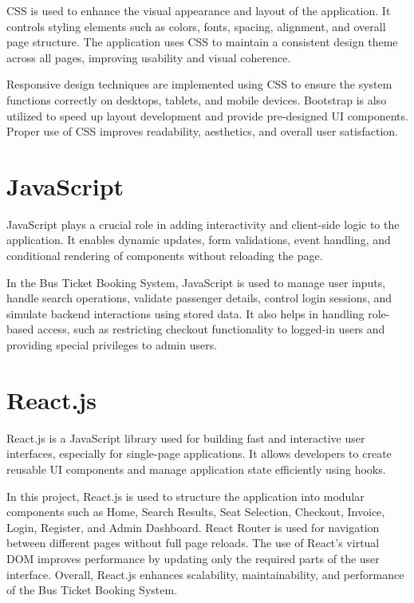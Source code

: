 CSS is used to enhance the visual appearance and layout of the application. It controls styling elements such as colors, fonts, spacing, alignment, and overall page structure. The application uses CSS to maintain a consistent design theme across all pages, improving usability and visual coherence.

Responsive design techniques are implemented using CSS to ensure the system functions correctly on desktops, tablets, and mobile devices. Bootstrap is also utilized to speed up layout development and provide pre-designed UI components. Proper use of CSS improves readability, aesthetics, and overall user satisfaction.

\section{JavaScript}

JavaScript plays a crucial role in adding interactivity and client-side logic to the application. It enables dynamic updates, form validations, event handling, and conditional rendering of components without reloading the page.

In the Bus Ticket Booking System, JavaScript is used to manage user inputs, handle search operations, validate passenger details, control login sessions, and simulate backend interactions using stored data. It also helps in handling role-based access, such as restricting checkout functionality to logged-in users and providing special privileges to admin users.

\section{React.js}

React.js is a JavaScript library used for building fast and interactive user interfaces, especially for single-page applications. It allows developers to create reusable UI components and manage application state efficiently using hooks.

In this project, React.js is used to structure the application into modular components such as Home, Search Results, Seat Selection, Checkout, Invoice, Login, Register, and Admin Dashboard. React Router is used for navigation between different pages without full page reloads. The use of React’s virtual DOM improves performance by updating only the required parts of the user interface. Overall, React.js enhances scalability, maintainability, and performance of the Bus Ticket Booking System.
